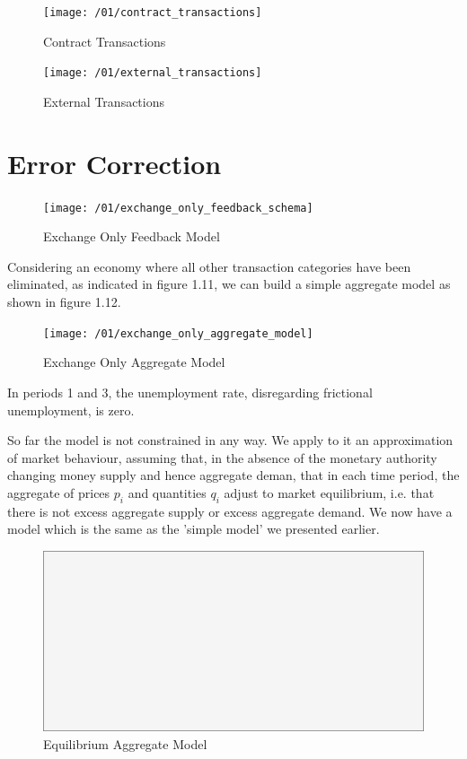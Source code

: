 \begin{figure}[H]
\centering
\texttt{[image: /01/contract\_transactions]}
\caption{Contract Transactions}
\label{fig:contract_transactions}
\end{figure}

\begin{figure}[H]
\centering
\texttt{[image: /01/external\_transactions]}
\caption{External Transactions}
\label{fig:external_transactions}
\end{figure}

\section{Error Correction}

\begin{figure}[H]
\centering
\texttt{[image: /01/exchange\_only\_feedback\_schema]}
\caption{Exchange Only Feedback Model}
\label{fig:exchange_only_feedback_schema}
\end{figure}

Considering an economy where all other transaction categories have been eliminated, as
indicated in figure 1.11, we can build a simple aggregate model as shown in figure 1.12.

\begin{figure}[H]
\centering
\texttt{[image: /01/exchange\_only\_aggregate\_model]}
\caption{Exchange Only Aggregate Model}
\label{fig:exchange_only_aggregate_model}
\end{figure}

In periods 1 and 3, the unemployment rate, disregarding frictional unemployment, is zero.

So far the model is not constrained in any way. We apply to it an approximation of market behaviour,
assuming that, in the absence of the monetary authority changing money supply and hence aggregate
deman, that in each time period, the aggregate of prices \(p_i\) and quantities \(q_i\) adjust to
market equilibrium, i.e. that there is not excess aggregate supply or excess aggregate demand. We
now have a model which is the same as the 'simple model' we presented earlier.

\begin{figure}[H]
\centering
\includegraphics[scale=0.48]{blank}
\caption{Equilibrium Aggregate Model}
\label{fig:equilibrium_aggregate_model}
\end{figure}

